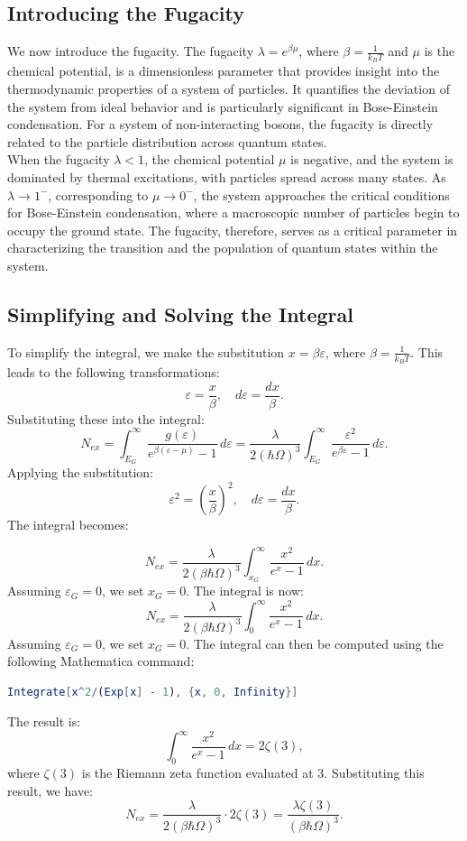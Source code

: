 \documentclass{article}
\numberwithin{equation}{section}
\numberwithin{equation}{subsection}
\begin{document}
\subsection{Introducing the Fugacity}

We now introduce the fugacity. The fugacity \( \lambda = e^{\beta \mu} \), where \( \beta = \frac{1}{k_B T} \) and \( \mu \) is the chemical potential, is a dimensionless parameter that provides insight into the thermodynamic properties of a system of particles. It quantifies the deviation of the system from ideal behavior and is particularly significant in Bose-Einstein condensation. For a system of non-interacting bosons, the fugacity is directly related to the particle distribution across quantum states.\\
When the fugacity \( \lambda < 1 \), the chemical potential \( \mu \) is negative, and the system is dominated by thermal excitations, with particles spread across many states. As \( \lambda \to 1^- \), corresponding to \( \mu \to 0^- \), the system approaches the critical conditions for Bose-Einstein condensation, where a macroscopic number of particles begin to occupy the ground state. The fugacity, therefore, serves as a critical parameter in characterizing the transition and the population of quantum states within the system.\\

\subsection{Simplifying and Solving the Integral}
To simplify the integral, we make the substitution \( x = \beta \varepsilon \), where \( \beta = \frac{1}{k_B T} \). This leads to the following transformations:
\[
\varepsilon = \frac{x}{\beta}, \quad d\varepsilon = \frac{dx}{\beta}.
\]
Substituting these into the integral:
\[
N_{ex} = \int_{E_G}^{\infty} \frac{g(\varepsilon)}{e^{\beta (\varepsilon - \mu)} - 1} \, d\varepsilon = \frac{\lambda}{2(\hbar \Omega)^3} \int_{E_G}^{\infty} \frac{\varepsilon^2}{e^{\beta \varepsilon} - 1} \, d\varepsilon.
\]
Applying the substitution:
\[
\varepsilon^2 = \left(\frac{x}{\beta}\right)^2, \quad d\varepsilon = \frac{dx}{\beta}.
\]
The integral becomes:

\[
N_{ex} = \frac{\lambda}{2(\beta \hbar \Omega)^3} \int_{x_G}^{\infty} \frac{x^2}{e^x - 1} \, dx.
\]
Assuming \( \varepsilon_G = 0 \), we set \( x_G = 0 \). The integral is now:
\[
N_{ex} = \frac{\lambda}{2(\beta \hbar \Omega)^3} \int_{0}^{\infty} \frac{x^2}{e^x - 1} \, dx.
\]
Assuming \( \varepsilon_G = 0 \), we set \( x_G = 0 \). The integral can then be computed using the following Mathematica command:
\begin{lstlisting}[language=Mathematica]
    Integrate[x^2/(Exp[x] - 1), {x, 0, Infinity}]
\end{lstlisting}
The result is:
\[
\int_{0}^{\infty} \frac{x^2}{e^x - 1} \,dx = 2\zeta(3),
\]
where \( \zeta(3) \) is the Riemann zeta function evaluated at 3. Substituting this result, we have:
\begin{equation}
    N_{ex} = \frac{\lambda}{2(\beta \hbar \Omega)^3} \cdot 2\zeta(3) = \frac{\lambda \zeta(3)}{(\beta \hbar \Omega)^3}.
\end{equation}
\end{document}
